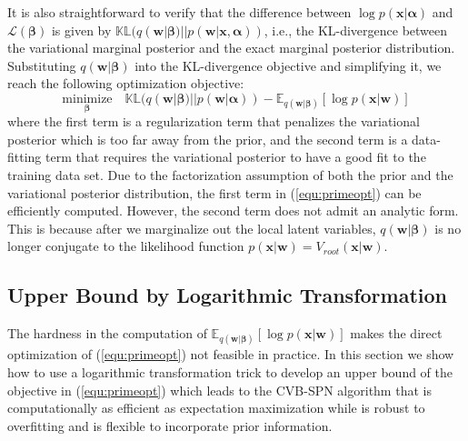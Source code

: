 \documentclass{article} %
\theoremstyle{definition}
\begin{document}
It is also straightforward to verify that the difference between $\log p(\mathbf{x}|\pmb\alpha)$ and $\mathcal{L}(\pmb\beta)$ is given by $\mathbb{KL}(q(\mathbf{w}|\pmb\beta)||p(\mathbf{w}|\mathbf{x},\pmb\alpha))$, i.e., the KL-divergence between the variational marginal posterior and the exact marginal posterior distribution. Substituting $q(\mathbf{w}|\pmb\beta)$ into the KL-divergence objective and simplifying it, we reach the following optimization objective:
\begin{equation}
\underset{\pmb\beta}{\text{minimize}}\quad\mathbb{KL}(q(\mathbf{w}|\pmb\beta) || p(\mathbf{w}|\pmb\alpha)) - \mathbb{E}_{q(\mathbf{w}|\pmb\beta)}[\log p(\mathbf{x}|\mathbf{w})]
\label{equ:primeopt}
\end{equation}
where the first term is a regularization term that penalizes the variational posterior which is too far away from the prior, and the second term is a data-fitting term that requires the variational posterior to have a good fit to the training data set. Due to the factorization assumption of both the prior and the variational posterior distribution, the first term in (\ref{equ:primeopt}) can be efficiently computed. However, the second term does not admit an analytic form. This is because after we marginalize out the local latent variables, $q(\mathbf{w}|\pmb\beta)$ is no longer conjugate to the likelihood function $p(\mathbf{x}|\mathbf{w}) = V_{root}(\mathbf{x}|\mathbf{w})$.

\subsection{Upper Bound by Logarithmic Transformation}
The hardness in the computation of $\mathbb{E}_{q(\mathbf{w}|\pmb\beta)}[\log p(\mathbf{x}|\mathbf{w})]$ makes the direct optimization of (\ref{equ:primeopt}) not feasible in practice. In this section we show how to use a logarithmic transformation trick to develop an upper bound of the objective in (\ref{equ:primeopt}) which leads to the CVB-SPN algorithm that is computationally as efficient as expectation maximization while is robust to overfitting and is flexible to incorporate prior information. 
\end{document}

